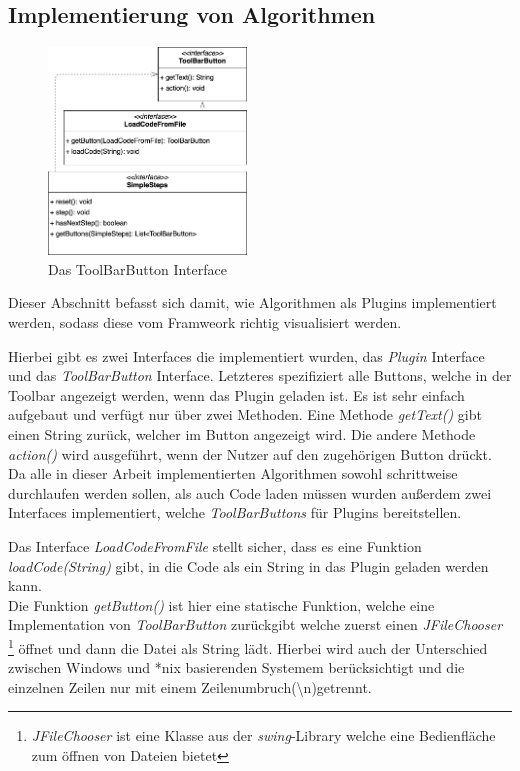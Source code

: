 \subsection{Implementierung von Algorithmen}
\begin{figure}
  \centering
  \includegraphics[width=0.47\textwidth]{fig/GUI_ToolBar_classes_methods.png}
  \caption{Das ToolBarButton Interface}
  \label{fig:ToolBarButtons}
\end{figure}


Dieser Abschnitt befasst sich damit, wie Algorithmen als Plugins implementiert werden,
sodass diese vom Framweork richtig visualisiert werden.

Hierbei gibt es zwei Interfaces die implementiert wurden, das \textit{Plugin} Interface
und das \textit{ToolBarButton} Interface.
Letzteres spezifiziert alle Buttons, welche in der Toolbar angezeigt werden, 
wenn das Plugin geladen ist. Es ist sehr einfach aufgebaut und verfügt nur über zwei Methoden.
Eine Methode \textit{getText()} gibt einen String zurück, welcher im Button angezeigt wird.
Die andere Methode \textit{action()} wird ausgeführt, wenn der Nutzer auf den zugehörigen Button drückt.\\
Da alle in dieser Arbeit implementierten Algorithmen sowohl schrittweise durchlaufen werden
sollen, als auch Code laden müssen wurden außerdem zwei Interfaces implementiert, 
welche \textit{ToolBarButtons} für Plugins bereitstellen.

Das Interface \textit{LoadCodeFromFile} stellt sicher, dass es eine Funktion \textit{loadCode(String)}
gibt, in die Code als ein String in das Plugin geladen werden kann.\\
Die Funktion \textit{getButton()} ist hier eine statische Funktion, welche eine Implementation
von \textit{ToolBarButton} zurückgibt welche zuerst einen \textit{JFileChooser}
\footnote{\textit{JFileChooser} ist eine Klasse aus der \textit{swing}-Library welche eine Bedienfläche zum öffnen von Dateien bietet}
öffnet und dann die Datei als String lädt. Hierbei wird auch der Unterschied
zwischen Windows und *nix basierenden Systemem berücksichtigt und die einzelnen
Zeilen nur mit einem Zeilenumbruch(\textbackslash n)getrennt.

